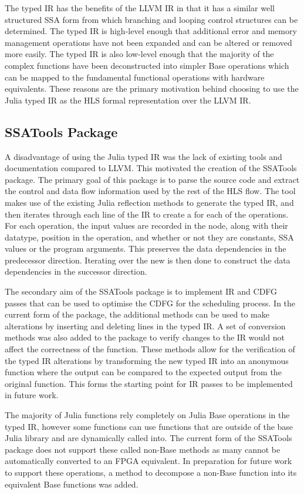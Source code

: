 The typed IR has the benefits of the LLVM IR in that it has a similar well structured SSA form from which branching and looping control structures can be determined.  The typed IR is high-level enough that additional error and memory management operations have not been expanded and can be altered or removed more easily. The typed IR is also low-level enough that the majority of the complex functions have been deconstructed into simpler Base operations which can be mapped to the fundamental functional operations with hardware equivalents. These reasons are the primary motivation behind choosing to use the Julia typed IR as the HLS formal representation over the LLVM IR.

\subsection{SSATools Package}
A disadvantage of using the Julia typed IR was the lack of existing tools and documentation compared to LLVM. This motivated the creation of the SSATools package. The primary goal of this package is to parse the source code and extract the control and data flow information used by the rest of the HLS flow. The tool makes use of the existing Julia reflection methods to generate the typed IR, and then iterates through each line of the IR to create a  for each of the operations. For each operation, the input values are recorded in the node, along with their datatype, position in the operation, and whether or not they are constants, SSA values or the program arguments. This preserves the data dependencies in the predecessor direction. Iterating over the new  is then done to construct the data dependencies in the successor direction.

The secondary aim of the SSATools package is to implement IR and CDFG passes that can be used to optimise the CDFG for the scheduling process. In the current form of the package, the additional methods can be used to make alterations by inserting and deleting lines in the typed IR. A set of conversion methods was also added to the package to verify changes to the IR would not affect the correctness of the function. These methods allow for the verification of the typed IR alterations by transforming the new typed IR into an anonymous function where the output can be compared to the expected output from the original function. This forms the starting point for IR passes to be implemented in future work. 

The majority of Julia functions rely completely on Julia Base operations in the typed IR, however some functions can use functions that are outside of the base Julia library and are dynamically called into. The current form of the SSATools package does not support these called non-Base methods as many cannot be automatically converted to an FPGA equivalent. In preparation for future work to support these operations, a method to decompose a non-Base function into its equivalent Base functions was added. 

